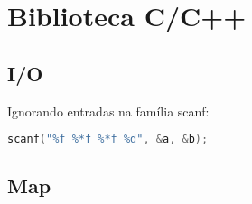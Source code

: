 \documentclass[a4paper,twocolumn, 10pt, landscape]{article}
\begin{document}

\section{Biblioteca C/C++}
\subsection{I/O}
Ignorando entradas na família scanf:
\begin{lstlisting}[language=c, label=cio, caption={Ignora os dois floats do meio. Retornará 2 no sucesso.}]
 scanf("%f %*f %*f %d", &a, &b);
\end{lstlisting}


\subsection{Map}

\end{document}

